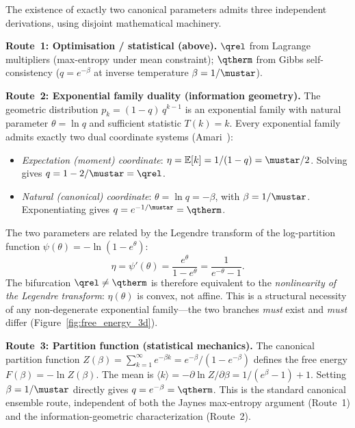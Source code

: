 \documentclass[12pt,a4paper]{article}
\begin{document}
\begin{remark}
\label{rem:bifurcation_routes}
The existence of exactly two canonical parameters admits three
independent derivations, using disjoint mathematical machinery.

\textbf{Route~1: Optimisation / statistical (above).}
$\qrel$ from Lagrange multipliers (max-entropy under mean constraint);
$\qtherm$ from Gibbs self-consistency ($q = e^{-\beta}$ at inverse
temperature $\beta = 1/\mustar$).

\textbf{Route~2: Exponential family duality (information geometry).}
The geometric distribution $p_k = (1-q)\,q^{k-1}$ is an exponential
family with natural parameter $\theta = \ln q$ and sufficient statistic
$T(k) = k$. Every exponential family admits exactly two dual coordinate
systems (Amari~\cite{Amari2016}):
\begin{itemize}[nosep]
\item \emph{Expectation (moment) coordinate}:
  $\eta = \mathbb{E}[k] = 1/(1-q) = \mustar/2$.
  Solving gives $q = 1 - 2/\mustar = \qrel$.
\item \emph{Natural (canonical) coordinate}:
  $\theta = \ln q = -\beta$, with $\beta = 1/\mustar$.
  Exponentiating gives $q = e^{-1/\mustar} = \qtherm$.
\end{itemize}
The two parameters are related by the Legendre transform of the
log-partition function $\psi(\theta) = -\ln(1 - e^\theta)$:
\begin{equation}
  \eta = \psi'(\theta) = \frac{e^\theta}{1 - e^\theta}
       = \frac{1}{e^{-\theta} - 1}.
  \label{eq:legendre_duality}
\end{equation}
The bifurcation $\qrel \neq \qtherm$ is therefore equivalent to the
\emph{nonlinearity of the Legendre transform}: $\eta(\theta)$ is convex,
not affine. This is a structural necessity of any non-degenerate
exponential family---the two branches \emph{must} exist and \emph{must}
differ (Figure~\ref{fig:free_energy_3d}).

\textbf{Route~3: Partition function (statistical mechanics).}
The canonical partition function
$Z(\beta) = \sum_{k=1}^\infty e^{-\beta k} = e^{-\beta}/(1-e^{-\beta})$
defines the free energy $F(\beta) = -\ln Z(\beta)$. The mean is
$\langle k \rangle = -\partial \ln Z / \partial\beta = 1/(e^\beta - 1) + 1$.
Setting $\beta = 1/\mustar$ directly gives $q = e^{-\beta} = \qtherm$.
This is the standard canonical ensemble route, independent of both the
Jaynes max-entropy argument (Route~1) and the information-geometric
characterization (Route~2).


\end{remark}
\end{document}
